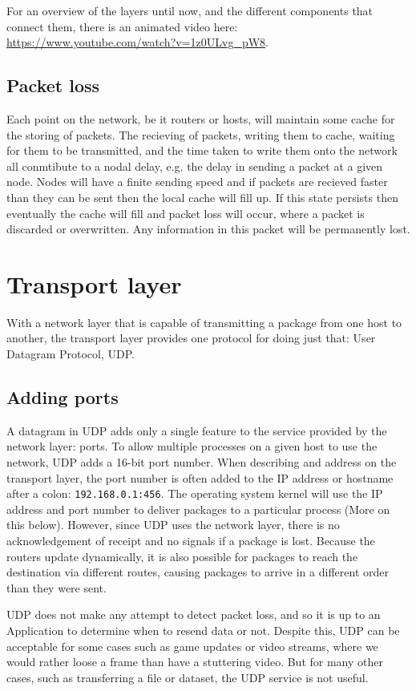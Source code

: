 For an overview of the layers until now, and the different components that connect them, there is an animated video here: \url{https://www.youtube.com/watch?v=1z0ULvg_pW8}.

\subsection{Packet loss}
Each point on the network, be it routers or hosts, will maintain some cache for the storing of packets. The recieving of packets, writing them to cache, waiting for them to be transmitted, and the time taken to write them onto the network all conmtibute to a nodal delay, e.g. the delay in sending a packet at a given node. Nodes will have a finite sending speed and if packets are recieved faster than they can be sent then the local cache will fill up. If this state persists then eventually the cache will fill and packet loss will occur, where a packet is discarded or overwritten. Any information in this packet will be permanently lost. 

\section{Transport layer}
With a network layer that is capable of transmitting a package from one host to another, the transport layer provides one protocol for doing just that: User Datagram Protocol, UDP.

\subsection{Adding ports}
A datagram in UDP adds only a single feature to the service provided by the network layer: ports. To allow multiple processes on a given host to use the network, UDP adds a 16-bit port number. When describing and address on the transport layer, the port number is often added to the IP address or hostname after a colon: \texttt{192.168.0.1:456}. The operating system kernel will use the IP address and port number to deliver packages to a particular process (More on this below). However, since UDP uses the network layer, there is no acknowledgement of receipt and no signals if a package is lost. Because the routers update dynamically, it is also possible for packages to reach the destination via different routes, causing packages to arrive in a different order than they were sent.

UDP does not make any attempt to detect packet loss, and so it is up to an Application to determine when to resend data or not. Despite this, UDP can be acceptable for some cases such as game updates or video streams, where we would rather loose a frame than have a stuttering video. But for many other cases, such as transferring a file or dataset, the UDP service is not useful.

